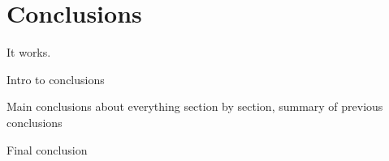 \chapter{Conclusions} \label{Chapter: Conclusions}
It works.

Intro to conclusions

Main conclusions about everything section by section, summary of previous conclusions

Final conclusion